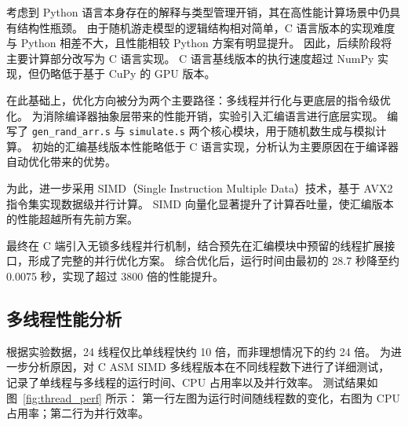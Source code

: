 \documentclass[a4paper,12pt]{article}
\begin{document}
\begin{CJK}{UTF8}{gbsn}
	考虑到 Python 语言本身存在的解释与类型管理开销，其在高性能计算场景中仍具有结构性瓶颈。
	由于随机游走模型的逻辑结构相对简单，C 语言版本的实现难度与 Python 相差不大，且性能相较 Python 方案有明显提升。
	因此，后续阶段将主要计算部分改写为 C 语言实现。
	C 语言基线版本的执行速度超过 NumPy 实现，但仍略低于基于 CuPy 的 GPU 版本。

	在此基础上，优化方向被分为两个主要路径：多线程并行化与更底层的指令级优化。
	为消除编译器抽象层带来的性能开销，实验引入汇编语言进行底层实现。
	编写了 \texttt{gen\_rand\_arr.s} 与 \texttt{simulate.s} 两个核心模块，用于随机数生成与模拟计算。
	初始的汇编基线版本性能略低于 C 语言实现，分析认为主要原因在于编译器自动优化带来的优势。

	为此，进一步采用 SIMD（Single Instruction Multiple Data）技术，基于 AVX2 指令集实现数据级并行计算。
	SIMD 向量化显著提升了计算吞吐量，使汇编版本的性能超越所有先前方案。

	最终在 C 端引入无锁多线程并行机制，结合预先在汇编模块中预留的线程扩展接口，形成了完整的并行优化方案。
	综合优化后，运行时间由最初的 28.7 秒降至约 0.0075 秒，实现了超过 3800 倍的性能提升。

	\subsection{多线程性能分析}
	根据实验数据，24 线程仅比单线程快约 10 倍，而非理想情况下的约 24 倍。
	为进一步分析原因，对 C ASM SIMD 多线程版本在不同线程数下进行了详细测试，
	记录了单线程与多线程的运行时间、CPU 占用率以及并行效率。
	测试结果如图~\ref{fig:thread_perf} 所示：
	第一行左图为运行时间随线程数的变化，右图为 CPU 占用率；第二行为并行效率。

	\begin{figure}[H]
		\centering
		\begin{minipage}[t]{0.48\textwidth}
			\centering
		\end{minipage}
		\hfill
		\begin{minipage}[t]{0.48\textwidth}
			\centering
		\end{minipage}


\end{figure}
\end{CJK}
\end{document}
